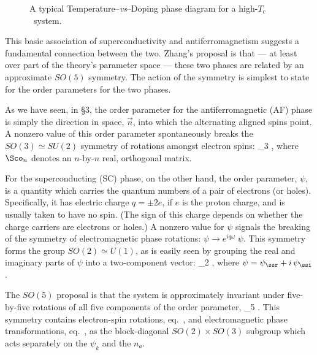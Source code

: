 \documentclass[12pt,epsf]{report}
\def\Tc{$T_c$}
\begin{document}
\begin{figure}
\vspace{2.4in}
\caption{A typical Temperature--{\it vs}--Doping phase
diagram for a high-\Tc\ system.}
\end{figure}


This basic association of superconductivity and 
antiferromagnetism suggests a fundamental  connection
between the two. Zhang's proposal is that --- at least over
part of the theory's parameter  space --- these two phases
are related by an approximate  $SO(5)$ symmetry. The action
of the symmetry is simplest to state for the order
parameters for the two phases.

As we have seen, in \S3, the order parameter for the
antiferromagnetic (AF) phase is simply the direction in
space, 
$\vec n$, into which the alternating aligned spins point. A
nonzero value of this order parameter spontaneously breaks
the $SO(3) 
\simeq SU(2)$ symmetry of rotations amongst electron spins: 
%
\eq
\label{sothreedef}
\to \Sco_3  \;  ,
\eeq
%
where $\Sco_n$ denotes an $n$-by-$n$ real, orthogonal
matrix.

For the superconducting (SC) phase, on the other hand, the
order parameter, $\psi$, is a quantity which carries the
quantum numbers of a pair of electrons (or holes).
Specifically, it has electric charge $q =  \pm2 e$, if $e$
is the proton charge, and is usually taken to have no
spin.  (The sign of this charge depends on whether the
charge carriers are electrons or holes.) A nonzero value
for $\psi$ signals the breaking of the symmetry of
electromagnetic phase rotations:  $\psi \to e^{iq \omega}
\; \psi$. This symmetry forms the group $SO(2) \simeq
U(1)$, as is easily seen by grouping the real and imaginary
parts of $\psi$ into a two-component vector:
%
\eq
\label{sotwodef}
\pmatrix{\psi_\ssr \cr \psi_\ssi \cr} \to 
\Sco_2  \; \pmatrix{\psi_\ssr \cr
\psi_\ssi \cr} ,  \eeq
%
where $\psi = \psi_\ssr + i \, \psi_\ssi$.

The $SO(5)$ proposal is that the system is approximately
invariant under five-by-five rotations of all five 
components of the order parameter,
%
\eq
\label{sofivedef}
 \to \Sco_5
\;  .
\eeq
%
This symmetry contains electron-spin rotations, 
eq.~, and electromagnetic phase
transformations, eq.~, as the
block-diagonal  $SO(2) \times SO(3)$ subgroup which acts
separately on the $\psi_k$ and the $n_a$.
\end{document}
